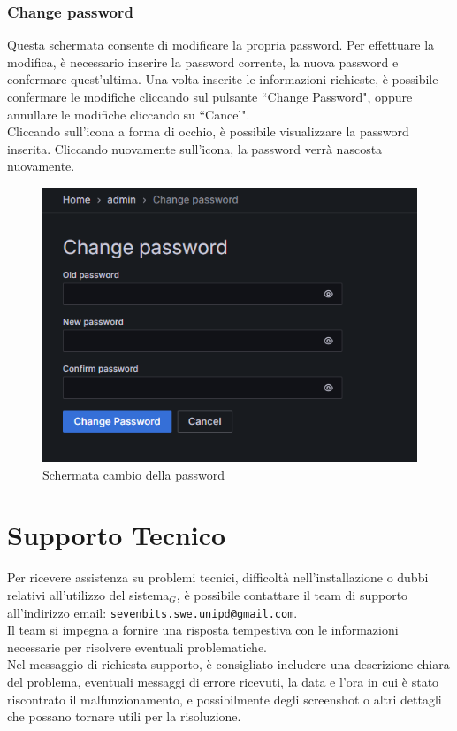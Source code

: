 \documentclass[10pt]{article}
\begin{document}
\begin{justify}
    \subsubsection{Change password}
    Questa schermata consente di modificare la propria password. Per effettuare la modifica, è necessario inserire la password corrente, la nuova password e confermare quest'ultima. Una volta inserite le informazioni richieste, è possibile confermare le modifiche cliccando sul pulsante ``Change Password", oppure annullare le modifiche cliccando su ``Cancel".\\
    Cliccando sull'icona a forma di occhio, è possibile visualizzare la password inserita. Cliccando nuovamente sull'icona, la password verrà nascosta nuovamente.
    \begin{figure}[H]
    \centering
    \includegraphics[width=0.5\linewidth]{password.png}
    \caption{Schermata cambio della password}
    \end{figure}

\newpage

\section{Supporto Tecnico}
\label{sec:supporto}
Per ricevere assistenza su problemi tecnici, difficoltà nell'installazione o dubbi relativi all'utilizzo del sistema$_G$, è possibile contattare il team di supporto all'indirizzo email: \texttt{sevenbits.swe.unipd@gmail.com}.\\
Il team si impegna a fornire una risposta tempestiva con le informazioni necessarie per risolvere eventuali problematiche.\\
Nel messaggio di richiesta supporto, è consigliato includere una descrizione chiara del problema, eventuali messaggi di errore ricevuti, la data e l'ora in cui è stato riscontrato il malfunzionamento, e possibilmente degli screenshot o altri dettagli che possano tornare utili per la risoluzione.




\end{justify}
\end{document}
